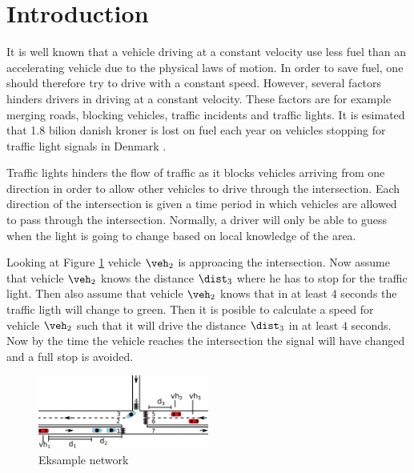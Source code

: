 \section{Introduction}

It is well known that a vehicle driving at a constant velocity use less fuel than an accelerating vehicle due to the physical laws of motion.
In order to save fuel, one should therefore try to drive with a constant speed. 
However, several factors hinders drivers in driving at a constant velocity. 
These factors are for example merging roads, blocking vehicles, traffic incidents and traffic lights. 
It is esimated that 1.8 bilion danish kroner is lost on fuel each year on vehicles stopping for traffic light signals in Denmark \cite{Vejdir}.

Traffic lights hinders the flow of traffic as it blocks vehicles arriving from one direction in order to allow other vehicles to drive through the intersection.
Each direction of the intersection is given a time period in which vehicles are allowed to pass through the intersection. 
Normally, a driver will only be able to guess when the light is going to change based on local knowledge of the area. 

Looking at Figure \ref{fig:Introduction:network} vehicle $\veh_2$ is approacing the intersection.
Now assume that vehicle $\veh_2$ knows the distance $\dist_3$ where he has to stop for the traffic light. 
Then also assume that vehicle $\veh_2$ knows that in at least $4$ seconds the traffic ligth will change to green. 
Then it is posible to calculate a speed for vehicle $\veh_2$ such that it will drive the distance $\dist_3$ in at least $4$ seconds. 
Now by the time the vehicle reaches the intersection the signal will have changed and a full stop is avoided.
\begin{figure}[htb]
\centering
\includegraphics[width=0.5\textwidth]{images/introNetwork.png}
\caption{Eksample network}
\label{fig:Introduction:network}
\end{figure}

